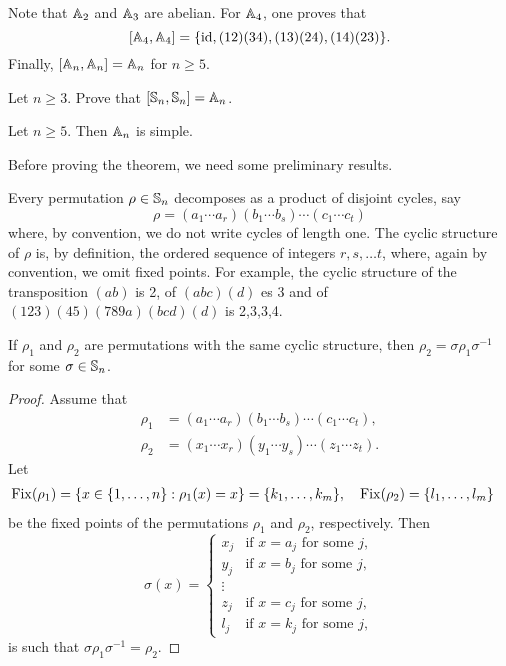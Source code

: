 Note that $\mathbb{A}_2$ and $\mathbb{A}_3$ are abelian. 
For $\mathbb{A}_4$, one proves that 
\[
[\mathbb{A}_4,\mathbb{A}_4]=\{\operatorname{id},(12)(34),(13)(24),(14)(23)\}.
\]
Finally, $[\mathbb{A}_n,\mathbb{A}_n]=\mathbb{A}_n$ for $n\geq5$. 

\begin{exercise}
    Let $n\geq3$. 
    Prove that $[\mathbb{S}_n,\mathbb{S}_n]=\mathbb{A}_n$. 
\end{exercise}

\begin{theorem}[Jordan]
\label{thm:Jordan}
    Let $n\geq5$. Then $\mathbb{A}_n$ is simple. 
\end{theorem}

Before proving the theorem, we need some preliminary results.

Every permutation $\rho\in\mathbb{S}_n$ decomposes as a product of disjoint cycles, say
\[
\rho=(a_1\cdots a_r)(b_1\cdots b_s)\cdots (c_1\cdots c_t)
\]
where, by convention, we do not write cycles of length one. 
The cyclic structure of $\rho$ is, by definition, the ordered 
sequence of integers $r,s,\dots t$, where, again by convention,  
we omit fixed points. For example, the cyclic structure of 
the transposition $(ab)$ is 2, 
of $(abc)(d)$ es 3 and of $(123)(45)(789a)(bcd)(d)$ is 2,3,3,4. 

\begin{lemma}
If $\rho_1$ and $\rho_2$ are permutations with the same
cyclic structure, then 
$\rho_2=\sigma\rho_1\sigma^{-1}$ for some
$\sigma\in\mathbb{S}_n$. 
\end{lemma}

\begin{proof}
Assume that 
\begin{align*}
\rho_1&=(a_1\cdots a_r)(b_1\cdots b_s)\cdots (c_1\cdots c_t),\\
\rho_2&=(x_1\cdots x_r)(y_1\cdots y_s)\cdots (z_1\cdots z_t).
\end{align*}
Let  
\begin{align*}
\operatorname{Fix}(\rho_1) &= \{x\in\{1,\dots,n\}:\rho_1(x)=x\}=\{k_1,\dots,k_m\},&&
\operatorname{Fix}(\rho_2)=\{l_1,\dots,l_m\}	
\end{align*}
be the fixed points of the permutations $\rho_1$ and $\rho_2$,
respectively. Then 
\[
\sigma(x)=\begin{cases}
x_j & \text{if $x=a_j$ for some $j$},\\
y_j & \text{if $x=b_j$ for some $j$},\\
\vdots\\
z_j & \text{if $x=c_j$ for some $j$},\\
l_j & \text{if $x=k_j$ for some $j$},	
\end{cases}
\]
is such that $\sigma\rho_1\sigma^{-1}=\rho_2$. 
\end{proof}

